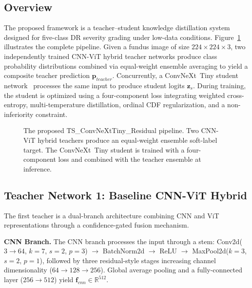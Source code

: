 \documentclass[10pt, twocolumn]{article}
\begin{document}
\subsection{Overview}
\label{sec:overview}

The proposed framework is a teacher--student knowledge distillation system designed
for five-class DR severity grading under low-data conditions. Figure~\ref{fig:architecture} illustrates the complete pipeline. Given a fundus image of
size $224 \times 224 \times 3$, two independently trained CNN-ViT hybrid teacher
networks produce class probability distributions combined via equal-weight ensemble
averaging to yield a composite teacher prediction $\mathbf{p}_{teacher}$.
Concurrently, a ConvNeXt~Tiny student network~\cite{liu2022} processes the same
input to produce student logits $\mathbf{z}_s$. During training, the student is
optimized using a four-component loss integrating weighted cross-entropy,
multi-temperature distillation, ordinal CDF regularization, and a non-inferiority
constraint.

\begin{figure}[h]
  \centering
  \caption{The proposed TS\_ConvNeXtTiny\_Residual pipeline. Two CNN-ViT hybrid
  teachers produce an equal-weight ensemble soft-label target. The ConvNeXt~Tiny
  student is trained with a four-component loss and combined with the teacher
  ensemble at inference.}
  \label{fig:architecture}
\end{figure}

\subsection{Teacher Network 1: Baseline CNN-ViT Hybrid}

The first teacher is a dual-branch architecture combining CNN and ViT
representations through a confidence-gated fusion mechanism.

\textbf{CNN Branch.} The CNN branch processes the input through a stem:
Conv2d($3{\to}64$, $k{=}7$, $s{=}2$, $p{=}3$) $\to$ BatchNorm2d $\to$ ReLU $\to$
MaxPool2d($k{=}3$, $s{=}2$, $p{=}1$), followed by three residual-style stages
increasing channel dimensionality ($64{\to}128{\to}256$). Global average pooling
and a fully-connected layer ($256{\to}512$) yield $\mathbf{f}_{cnn} \in
\mathbb{R}^{512}$.
\end{document}
